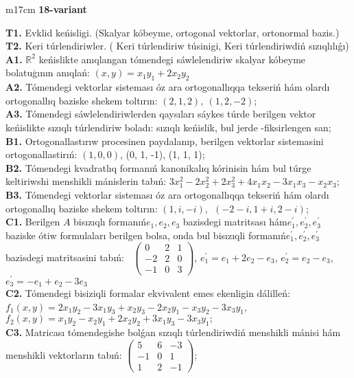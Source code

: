 \documentclass{article}
\begin{document}
\begin{tabular}{m{17cm}}
\textbf{18-variant}
\newline

\textbf{T1.} Evklid keńisligi. (Skalyar kóbeyme, ortogonal vektorlar, ortonormal bazis.) \\
\textbf{T2.} Keri túrlendiriwler. ( Keri túrlendiriw túsinigi,   Keri túrlendiriwdiń sızıqlılıǵı) \\
\textbf{A1.} \(\mathbb{R}^{2}\) keńislikte anıqlangan tómendegi sáwlelendiriw skalyar kóbeyme bolatuģının anıqlań: \((x,y) = x_{1}y_{1} + 2x_{2}y_{2}\) \\
\textbf{A2.} Tómendegi vektorlar sisteması óz ara ortogonallıqqa tekseriń hám olardı ortogonallıq baziske shekem toltırın: \((2,1,2),\ (1,2, - 2)\); \\
\textbf{A3.} Tómendegi sáwlelendiriwlerden qaysıları sáykes túrde berilgen vektor keńislikte sızıqlı túrlendiriw boladı: sızıqlı keńislik, bul jerde -fiksirlengen san; \\
\textbf{B1.} Ortogonallastırıw procesinen paydalanıp, berilgen vektorlar sistemasini ortogonallastirıń: \((1,0,0)\), (0, 1, -1), (1, 1, 1); \\
\textbf{B2.} Tómendegi kvadratlıq formanıń kanonikalıq kórinisin hám bul túrge keltiriwshi menshikli mánislerin tabıń: \(3x_{1}^{2} - 2x_{2}^{2} + 2x_{3}^{2} + 4x_{1}x_{2} - 3x_{1}x_{3} - x_{2}x_{3}\); \\
\textbf{B3.} Tómendegi vektorlar sisteması óz ara ortogonallıqqa tekseriń hám olardı ortogonallıq baziske shekem toltırın: \((1,i, - i),\ \ ( - 2 - i,1 + i,2 - i)\); \\
\textbf{C1.} Berilgen \(A\) bisızıqlı formanıń\(e_{1},e_{2},e_{3}\) bazisdegi matritsası hám\(e_{1}^{'},e_{2}^{'},e_{3}^{'}\) baziske ótiw formulaları berilgen bolsa, onda bul bisızıqli formanıń\(e_{1}^{'},e_{2}^{'},e_{3}^{'}\) bazisdegi matritsasini tabıń: \(\ \) \(\begin{pmatrix} 0 & 2 & 1 \\  - 2 & 2 & 0 \\  - 1 & 0 & 3 \end{pmatrix}\), \(e_{1}^{'} = e_{1} + 2e_{2} - e_{3}\), \(e_{2}^{'} = e_{2} - e_{3}\), \(e_{3}^{'} = - e_{1} + e_{2} - 3e_{3}\) \\
\textbf{C2.} Tómendegi bisiziqli formalar ekvivalent emes ekenligin dálilleń:\(f_{1}(x,y) = 2x_{1}y_{2} - 3x_{1}y_{3} + x_{2}y_{3} - 2x_{2}y_{1} - x_{3}y_{2} - 3x_{3}y_{1}\),\(f_{2}(x,y) = x_{1}y_{2} - x_{2}y_{1} + 2x_{2}y_{2} + 3x_{1}y_{3} - 3x_{3}y_{1};\) \\
\textbf{C3.} Matricası tómendegishe bolǵan sızıqlı túrlendiriwdiń menshikli mánisi hám menshikli vektorların tabıń: \(\begin{pmatrix} 5 & 6 & - 3 \\  - 1 & 0 & 1 \\ 1 & 2 & - 1 \end{pmatrix}\); \\

\end{tabular}
\vspace{1cm}
\end{document}
